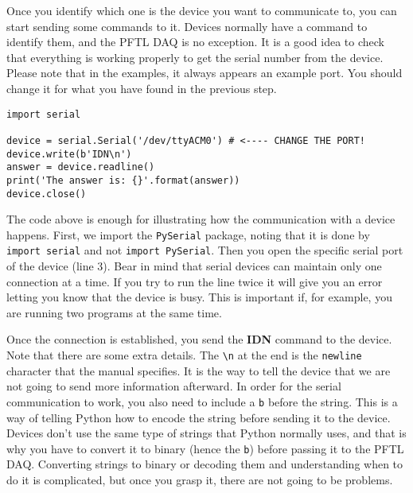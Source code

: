 
Once you identify which one is the device you want to communicate to,
you can start sending some commands to it. Devices normally have a
command to identify them, and the {PFTL} {DAQ} is no exception. It is a
good idea to check that everything is working properly to get the serial
number from the device. Please note that in the examples, it always
appears an example port. You should change it for what you have found in
the previous step.


\begin{verbatim}
import serial

device = serial.Serial('/dev/ttyACM0') # <---- CHANGE THE PORT!
device.write(b'IDN\n')
answer = device.readline()
print('The answer is: {}'.format(answer))
device.close()
\end{verbatim}

The code above is enough for illustrating how the communication with a
device happens. First, we import the \texttt{PySerial} package, noting
that it is done by \texttt{import\ serial} and not
\texttt{import\ PySerial}. Then you open the specific serial port of the
device (line 3). Bear in mind that serial devices can maintain only one
connection at a time. If you try to run the line twice it will give you
an error letting you know that the device is busy. This is important if,
for example, you are running two programs at the same time.

Once the connection is established, you send the \textbf{{IDN}} command
to the device. Note that there are some extra details. The
\texttt{\textbackslash{}n} at the end is the \texttt{newline} character
that the manual specifies. It is the way to tell the device that we are
not going to send more information afterward. In order for the serial
communication to work, you also need to include a \texttt{b} before the
string. This is a way of telling Python how to encode the string before
sending it to the device. Devices don't use the same type of strings
that Python normally uses, and that is why you have to convert it to
binary (hence the \texttt{b}) before passing it to the {PFTL} {DAQ}.
Converting strings to binary or decoding them and understanding when to
do it is complicated, but once you grasp it, there are not going to
be problems.

